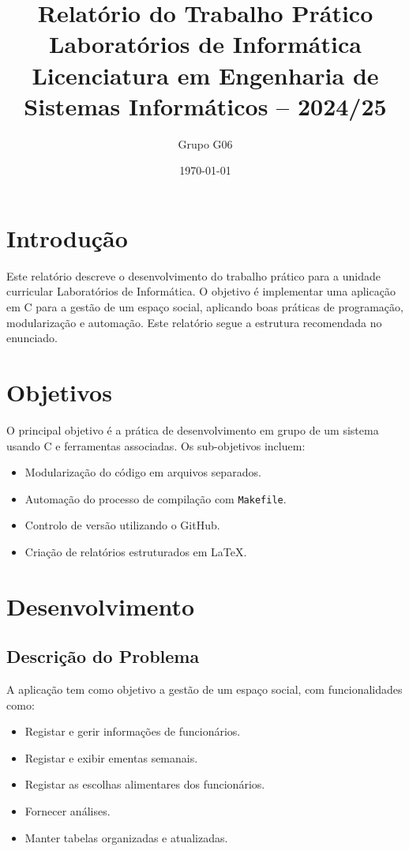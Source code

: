 \documentclass[a4paper,12pt]{report}
\title{%
  \textbf{Relatório do Trabalho Prático}\\[4em]
  \large Laboratórios de Informática \\[4em]
  Licenciatura em Engenharia de Sistemas Informáticos -- 2024/25
}
\author{Grupo G06}
\date{\today}
\begin{document}
\maketitle

\tableofcontents
\listoffigures
\listoftables

\chapter{Introdução}
Este relatório descreve o desenvolvimento do trabalho prático para a unidade curricular Laboratórios de Informática. O objetivo é implementar uma aplicação em C para a gestão de um espaço social, aplicando boas práticas de programação, modularização e automação. Este relatório segue a estrutura recomendada no enunciado.

\chapter{Objetivos}
O principal objetivo é a prática de desenvolvimento em grupo de um sistema usando C e ferramentas associadas. Os sub-objetivos incluem:
\begin{itemize}
    \item Modularização do código em arquivos separados.
    \item Automação do processo de compilação com \texttt{Makefile}.
    \item Controlo de versão utilizando o GitHub.
    \item Criação de relatórios estruturados em LaTeX.
\end{itemize}

\chapter{Desenvolvimento}

\section{Descrição do Problema}
A aplicação tem como objetivo a gestão de um espaço social, com funcionalidades como:
\begin{itemize}
    \item Registar e gerir informações de funcionários.
    \item Registar e exibir ementas semanais.
    \item Registar as escolhas alimentares dos funcionários.
    \item Fornecer análises.
    \item Manter tabelas organizadas e atualizadas.
\end{itemize}
\end{document}
